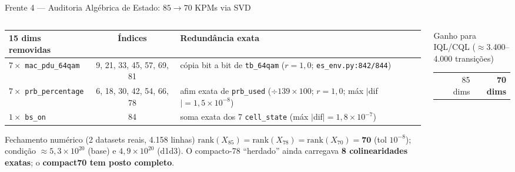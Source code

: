 \documentclass[aspectratio=169,10pt,xcolor={dvipsnames,table}]{beamer}
\begin{document}
\begin{frame}{Frente 4 --- Auditoria Alg\'ebrica de Estado: $85 \to 70$ KPMs via SVD}
  \begin{columns}[T]
    \begin{column}{0.55\textwidth}
      \begin{table}
        \centering\scriptsize
        \renewcommand{\arraystretch}{1.12}
        \begin{tabular}{@{}p{3.3cm}cp{3.6cm}@{}}
          \toprule
          \textbf{15 dims removidas} & \textbf{Índices} & \textbf{Redundância exata} \\
          \midrule
          $7\times$ \texttt{mac\_pdu\_64qam} & 9, 21, 33, 45, 57, 69, 81 &
            cópia bit a bit de \texttt{tb\_64qam} ($r = 1{,}0$;
            \texttt{es\_env.py:842/844}) \\
          $7\times$ \texttt{prb\_percentage} & 6, 18, 30, 42, 54, 66, 78 &
            afim exata de \texttt{prb\_used} ($\div139{\times}100$; $r=1{,}0$;
            máx $|$dif$| = 1{,}5\!\times\!10^{-8}$) \\
          $1\times$ \texttt{bs\_on} & 84 &
            soma exata dos 7 \texttt{cell\_state}
            (máx $|$dif$| = 1{,}8\!\times\!10^{-7}$) \\
          \bottomrule
        \end{tabular}
      \end{table}
      \begin{exampleblock}{Fechamento numérico (2 datasets reais, 4.158 linhas)}
        \small $\text{rank}(X_{85}) = \text{rank}(X_{78}) =
        \text{rank}(X_{70}) = \mathbf{70}$ (tol $10^{-8}$); condição
        $\approx 5{,}3\!\times\!10^{20}$ (base) e
        $4{,}9\!\times\!10^{20}$ (d1d3). O compacto-78 ``herdado'' ainda
        carregava \textbf{8 colinearidades exatas}; o \textbf{compact70 tem
        posto completo}.
      \end{exampleblock}
    \end{column}
    \begin{column}{0.43\textwidth}
      \begin{block}{Ganho para IQL/CQL ($\approx$3.400--4.000 transições)}
        \centering\small
        \begin{tabular}{@{}lrr@{}}
          \toprule
           & 85 dims & \textbf{70 dims} \\

\end{tabular}
\end{block}
\end{column}
\end{columns}
\end{frame}
\end{document}
